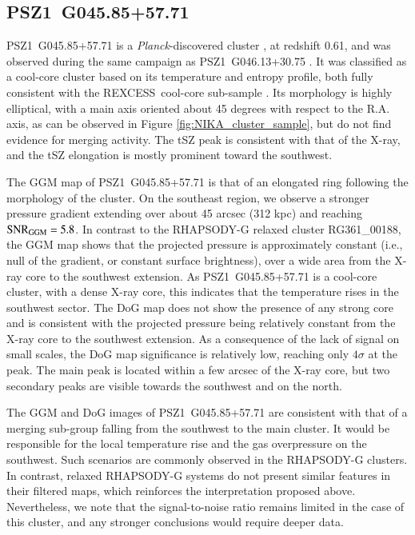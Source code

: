 \documentclass[twocolumn,traditabstract]{aa}
\newcommand{\rexcess}{{\gwpfont REXCESS}}
\begin{document}
\subsection{PSZ1~G045.85+57.71}
\mbox{PSZ1~G045.85+57.71} is a \textit{Planck}-discovered cluster \citep{PlanckXXIX2014}, at redshift 0.61, and was observed during the same campaign as \mbox{PSZ1~G046.13+30.75} \citep[see][for more details]{Ruppin2016}. It was classified as a cool-core cluster based on its temperature and entropy profile, both fully consistent with the \rexcess\ cool-core sub-sample \citep{Bohringer2007,Arnaud2010,Pratt2010}. Its morphology is highly elliptical, with a main axis oriented about 45 degrees with respect to the R.A. axis, as can be observed in Figure \ref{fig:NIKA_cluster_sample}, but \cite{Ruppin2016} do not find evidence for merging activity. The tSZ peak is consistent with that of the X-ray, and the tSZ elongation is mostly prominent toward the southwest.

The GGM map of \mbox{PSZ1~G045.85+57.71} is that of an elongated ring following the morphology of the cluster. On the southeast region, we observe a stronger pressure gradient extending over about 45 arcsec (312 kpc) and reaching ${\rm SNR}_{\rm GGM} = 5.8$. In contrast to the RHAPSODY-G relaxed cluster RG361\_00188, the GGM map shows that the projected pressure is approximately constant (i.e., null of the gradient, or constant surface brightness), over a wide area from the X-ray core to the southwest extension. As \mbox{PSZ1~G045.85+57.71} is a cool-core cluster, with a dense X-ray core, this indicates that the temperature rises in the southwest sector. The DoG map does not show the presence of any strong core and is consistent with the projected pressure being relatively constant from the X-ray core to the southwest extension. As a consequence of the lack of signal on small scales, the DoG map significance is relatively low, reaching only $4 \sigma$ at the peak. The main peak is located within a few arcsec of the X-ray core, but two secondary peaks are visible towards the southwest and on the north.

The GGM and DoG images of \mbox{PSZ1~G045.85+57.71} are consistent with that of a merging sub-group falling from the southwest to the main cluster. It would be responsible for the local temperature rise and the gas overpressure on the southwest. Such scenarios are commonly observed in the RHAPSODY-G clusters. In contrast, relaxed RHAPSODY-G systems do not present similar features in their filtered maps, which reinforces the interpretation proposed above. Nevertheless, we note that the signal-to-noise ratio remains limited in the case of this cluster, and any stronger conclusions would require deeper data.
\end{document}
